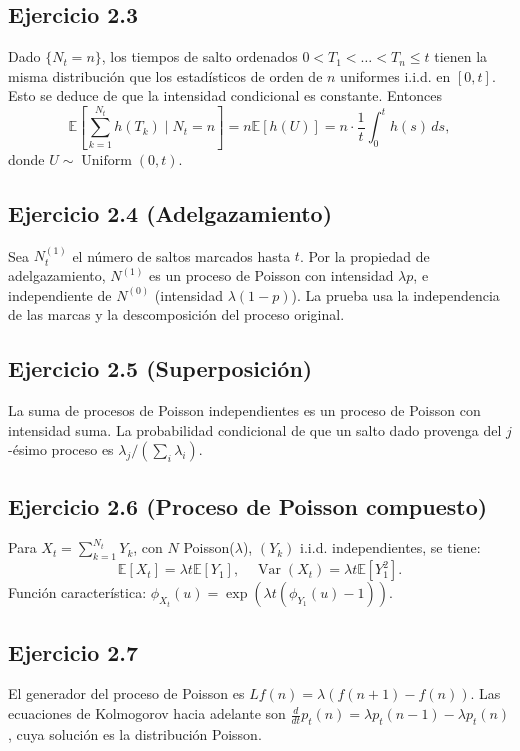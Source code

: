 \documentclass[letterpaper, 12pt]{article}
\newcommand{\E}{\mathbb{E}}
\newcommand{\1}{\mathbbm{1}}
\DeclareMathOperator{\Var}{Var}
\DeclareMathOperator{\Uniform}{Uniform}
\begin{document}
    \subsection{Ejercicio 2.3}
    Dado $\{N_t=n\}$, los tiempos de salto ordenados $0<T_1<\dots<T_n\le t$ tienen la misma distribuci\'on que los estad\'isticos de orden de $n$ uniformes i.i.d. en $[0,t]$. Esto se deduce de que la intensidad condicional es constante. Entonces
    \[
    \E\left[\sum_{k=1}^{N_t}h(T_k)\mid N_t=n\right]=n\E[h(U)]=n\cdot\frac1t\int_0^t h(s)\,ds,
    \]
    donde $U\sim\Uniform(0,t)$.

    \subsection{Ejercicio 2.4 (Adelgazamiento)}
    Sea $N_t^{(1)}$ el n\'umero de saltos marcados hasta $t$. Por la propiedad de adelgazamiento, $N^{(1)}$ es un proceso de Poisson con intensidad $\lambda p$, e independiente de $N^{(0)}$ (intensidad $\lambda(1-p)$). La prueba usa la independencia de las marcas y la descomposici\'on del proceso original.

    \subsection{Ejercicio 2.5 (Superposici\'on)}
    La suma de procesos de Poisson independientes es un proceso de Poisson con intensidad suma. La probabilidad condicional de que un salto dado provenga del $j$-\'esimo proceso es $\lambda_j/(\sum_i\lambda_i)$.

    \subsection{Ejercicio 2.6 (Proceso de Poisson compuesto)}
    Para $X_t=\sum_{k=1}^{N_t}Y_k$, con $N$ Poisson($\lambda$), $(Y_k)$ i.i.d. independientes, se tiene:
    \[
    \E[X_t]=\lambda t\E[Y_1],\quad \Var(X_t)=\lambda t\E[Y_1^2].
    \]
    Funci\'on caracter\'istica: $\phi_{X_t}(u)=\exp(\lambda t(\phi_{Y_1}(u)-1))$.

    \subsection{Ejercicio 2.7}
    El generador del proceso de Poisson es $Lf(n)=\lambda(f(n+1)-f(n))$. Las ecuaciones de Kolmogorov hacia adelante son $\frac{d}{dt}p_t(n)=\lambda p_t(n-1)-\lambda p_t(n)$, cuya soluci\'on es la distribuci\'on Poisson.
\end{document}
